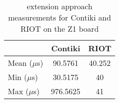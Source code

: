 \begin{table}[!ht]
  \centering
  \begin{tabular}{l|c|c}
                & Contiki  & RIOT \\ \hline
  Mean ($\mu$s) & 90.5761  & 40.252      \\
  Min  ($\mu$s) & 30.5175  & 40      \\
  Max  ($\mu$s) & 976.5625 & 41     
  \end{tabular}
  \caption{extension approach measurements for Contiki and RIOT on the Z1 board}
  \label{tab:extension-framework-z1}
  \end{table}